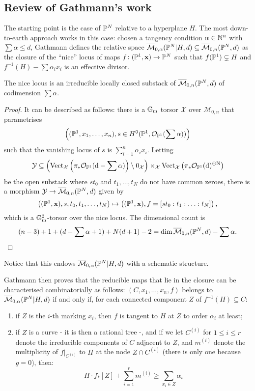 \subsection{Review of Gathmann's work} The starting point is the case of $\mathbb P^N$ relative to a hyperplane $H$. The most down-to-earth approach works in this case: chosen a tangency condition $\alpha\in\mathbb{N}^n$ with $\sum\alpha\leq d$, Gathmann defines the relative space $\overline{\mathcal{M}}_{0,\alpha}(\mathbb P^N|H,d)\subseteq \overline{\mathcal{M}}_{0,n}(\mathbb P^N,d)$ as the closure of the ``nice'' locus of maps $f\colon(\mathbb P^1,\mathbf x)\rightarrow \mathbb P^N$ such that $f(\mathbb P^1)\subsetneq H$ and $f^{-1}(H)-\sum\alpha_ix_i$ is an effective divisor.
\begin{lem}\cite[Lemma 1.8]{Ga}\label{lem:irr}
 The nice locus is an irreducible locally closed substack of $\overline{\mathcal{M}}_{0,n}(\mathbb P^N,d)$ of codimension $\sum\alpha$.
\end{lem}
\begin{proof}
 It can be described as follows: there is a $\mathbb{G}_{\text{m}}$ torsor $\mathcal X$ over $\mathcal{M}_{0,n}$ that parametrises \[\left((\mathbb P^1,x_1,\ldots,x_n),s\in H^0(\mathbb P^1,\mathcal{O}_{\mathbb P^1}(\sum\alpha))\right)\]
 such that the vanishing locus of $s$ is $\sum_{i=1}^n\alpha_ix_i$. Letting \[\mathcal Y\subseteq\left(\rm{Vect}_{\mathcal X}\left(\pi_*\mathcal{O}_{\mathbb P^1}(d-\sum\alpha)\right)\setminus 0_{\mathcal X}\right)\times_{\mathcal X} \rm{Vect}_{\mathcal X}\left(\pi_*\mathcal{O}_{\mathbb P^1}(d)^{\oplus N}\right)\] be the open substack where $st_0$ and $t_1,\ldots,t_N$ do not have common zeroes, there is a morphism $\mathcal Y\rightarrow \overline{\mathcal{M}}_{0,n}(\mathbb P^N,d)$ given by
 \[\left((\mathbb P^1,\mathbf x),s,t_0,t_1,\ldots,t_N\right)\mapsto \left((\mathbb P^1,\mathbf x),f=[st_0:t_1:\ldots:t_N]\right),\]
 which is a $\mathbb{G}_{\text{m}}^2$-torsor over the nice locus. The dimensional count is \[(n-3)+1+(d-\sum\alpha+1)+N(d+1)-2=\dim \overline{\mathcal{M}}_{0,n}(\mathbb P^N,d)-\sum\alpha.\]
\end{proof}
\noindent Notice that this endows $\overline{\mathcal{M}}_{0,\alpha}(\mathbb P^N|H,d)$ with a schematic structure.

\begin{rmk}\label{rmk:combin}
Gathmann then proves \cite[Proposition 1.14]{Ga} that the reducible maps that lie in the closure can be characterised combinatorially as follows: $(C,x_1, \ldots, x_n,f)$ belongs to $\overline{\mathcal{M}}_{0,\alpha}(\mathbb P^N|H,d)$ if and only if, for each connected component $Z$ of $f^{-1}(H) \subseteq C$:
\begin{enumerate}
\item if $Z$ is the $i$-th marking $x_i$, then $f$ is tangent to $H$ at $Z$ to order $\alpha_i$ at least;
\item if $Z$ is a curve - it is then a rational tree -, and if we let $C^{(i)}$ for $1 \leq i \leq r$ denote the irreducible components of $C$ adjacent to $Z$, and $m^{(i)}$ denote the multiplicity of $f|_{C^{(i)}}$ to $H$ at the node $Z \cap C^{(i)}$ (there is only one because $g=0$), then:
\begin{equation} \label{Relative stable map internal component inequality} H \cdot f_* [Z] + \sum_{i=1}^r m^{(i)} \geq \sum_{x_i \in Z} \alpha_i \end{equation}
\end{enumerate} 
\end{rmk}

